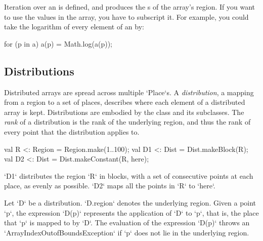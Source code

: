 Iteration over an  is defined, and produces the s of the
array's region.  If you want to use the values in the array, you have to
subscript it.  For example, you could take the logarithm of every element of an
 by: 
\begin{xten}
for (p in a) a(p) = Math.log(a(p));
\end{xten}




\subsection{Distributions}\label{XtenDistributions}

Distributed arrays are spread across multiple \xcd`Place`s.  
A {\em distribution}, a mapping from a region to a set of places, 
describes where each element of a distributed array is kept.
Distributions are embodied by the class  and its
subclasses. 
The {\em rank} of a distribution is the rank of the underlying region, and
thus the rank of every point that the distribution applies to.


\begin{ex}
\begin{xten}
val R  <: Region = Region.make(1..100);
val D1 <: Dist = Dist.makeBlock(R);
val D2 <: Dist = Dist.makeConstant(R, here);
\end{xten}

\xcd`D1` distributes the region \xcd`R` in blocks, with a set of consecutive
points at each place, as evenly as possible.  \xcd`D2` maps all the points in
\xcd`R` to \xcd`here`.  
\end{ex}

Let \xcd`D` be a distribution. 
\xcd`D.region` 
denotes the underlying
region. 
Given a point \xcd`p`, the expression
\xcd`D(p)` represents the application of \xcd`D` to \xcd`p`, that is,
the place that \xcd`p` is mapped to by \xcd`D`. The evaluation of the
expression \xcd`D(p)` throws an \xcd`ArrayIndexOutofBoundsException`
if \xcd`p` does not lie in the underlying region.


